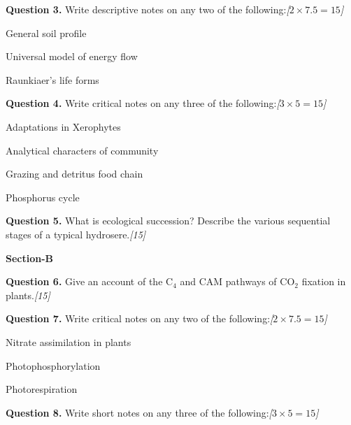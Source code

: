 \documentclass[11pt,a4paper]{article}
\newcommand{\pts}[1]{\hfill   \textit{[#1]}}
\begin{document}
\noindent   \textbf{Question 3.} Write descriptive notes on any two of the following:\pts{$2  \times 7.5 = 15$}

\begin{parts}
  \item General soil profile
  \item Universal model of energy flow
  \item Raunkiaer's life forms
\end{parts}

\medskip


\noindent   \textbf{Question 4.} Write critical notes on any three of the following:\pts{$3  \times 5 = 15$}

\begin{parts}
  \item Adaptations in Xerophytes
  \item Analytical characters of community
  \item Grazing and detritus food chain
  \item Phosphorus cycle
\end{parts}

\medskip


\noindent   \textbf{Question 5.} What is ecological succession? Describe the various sequential stages of a typical hydrosere.\pts{15}

\bigskip

\begin{center}
   \textbf{Section-B}
\end{center}
\medskip

\medskip


\noindent   \textbf{Question 6.} Give an account of the $ \text{C}_4$ and CAM pathways of $ \text{CO}_2$ fixation in plants.\pts{15}

\medskip


\noindent   \textbf{Question 7.} Write critical notes on any two of the following:\pts{$2  \times 7.5 = 15$}

\begin{parts}
  \item Nitrate assimilation in plants
  \item Photophosphorylation
  \item Photorespiration
\end{parts}

\medskip


\noindent   \textbf{Question 8.} Write short notes on any three of the following:\pts{$3  \times 5 = 15$}
\end{document}
